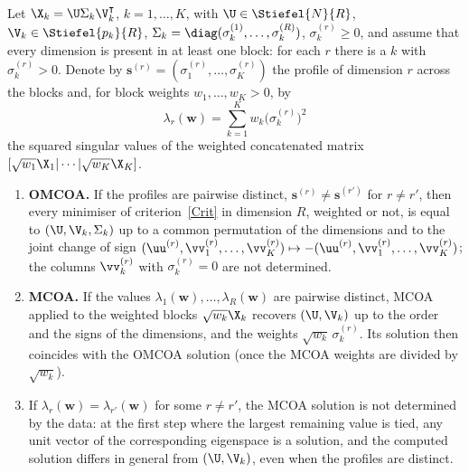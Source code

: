 
\begin{proposition}\label{prop:identif}
Let $\X_k=\U\Sigma_k\V_k^\intercal$, $k=1,\ldots,K$, with $\U\in\Stiefel{N}{R}$,
$\V_k\in\Stiefel{p_k}{R}$, $\Sigma_k=\diag(\sigma_k^{(1)},\ldots,\sigma_k^{(R)})$,
$\sigma_k^{(r)}\geq 0$, and assume that every dimension is present in at least
one block: for each $r$ there is a $k$ with $\sigma_k^{(r)}>0$. Denote by
$\mathbf s^{(r)}=(\sigma_1^{(r)},\ldots,\sigma_K^{(r)})$ the profile of dimension
$r$ across the blocks and, for block weights $w_1,\ldots,w_K>0$, by
\[
  \lambda_r(\mathbf w)=\sum_{k=1}^K w_k\bigl(\sigma_k^{(r)}\bigr)^2
\]
the squared singular values of the weighted concatenated matrix
$[\sqrt{w_1}\X_1|\cdots|\sqrt{w_K}\X_K]$.
\begin{enumerate}
  \item[(a)] \textbf{OMCOA.} If the profiles are pairwise distinct,
  $\mathbf s^{(r)}\neq\mathbf s^{(r')}$ for $r\neq r'$, then every minimiser of
  criterion~\eqref{Crit} in dimension $R$, weighted or not, is equal to
  $(\U,\V_k,\Sigma_k)$ up to a common permutation of the dimensions and to
  the joint change of sign $(\uu^{(r)},\vv_1^{(r)},\ldots,\vv_K^{(r)})\mapsto
  -(\uu^{(r)},\vv_1^{(r)},\ldots,\vv_K^{(r)})$; the columns $\vv_k^{(r)}$ with
  $\sigma_k^{(r)}=0$ are not determined.
  \item[(b)] \textbf{MCOA.} If the values $\lambda_1(\mathbf w),\ldots,
  \lambda_R(\mathbf w)$ are pairwise distinct, MCOA applied to the weighted
  blocks $\sqrt{w_k}\X_k$ recovers $(\U,\V_k)$ up to the order and the signs of
  the dimensions, and the weights $\sqrt{w_k}\,\sigma_k^{(r)}$. Its solution
  then coincides with the OMCOA solution (once the MCOA weights are divided by
  $\sqrt{w_k}$).
  \item[(c)] If $\lambda_r(\mathbf w)=\lambda_{r'}(\mathbf w)$ for some
  $r\neq r'$, the MCOA solution is not determined by the data: at the first
  step where the largest remaining value is tied, any unit vector of the
  corresponding eigenspace is a solution, and the computed solution differs
  in general from $(\U,\V_k)$, even when the profiles are distinct.
\end{enumerate}
\end{proposition}


